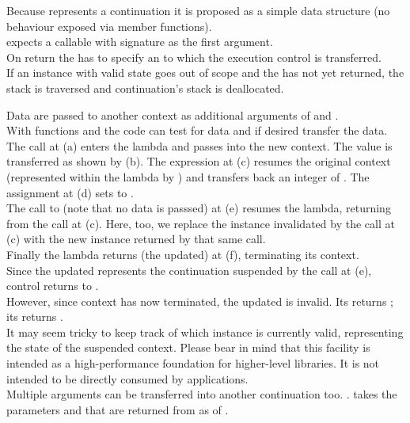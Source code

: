 \label{design}

Because \cont represents a continuation it is proposed as a simple data
structure (no behaviour exposed via member functions).\\
\call expects a callable with signature
 as the first argument.\\
On return the \entryfn has to specify an \cont to which the execution control is
transferred.\\
If an instance with valid state goes out of scope and the \entryfn has not yet
returned, the stack is traversed  and continuation's stack is deallocated.


\label{subsec:data}

Data are passed to another context as additional arguments of \call and
\resume.\\
With functions \davail and \dtransfer the code can test for data and if desired
transfer the data.
The  call at (a) enters the lambda and passes  into the
new context. The value is transferred as shown by (b). The expression
 at (c) resumes the original context (represented
within the lambda by ) and transfers back an integer of .
The assignment at (d) sets  to .\\
The call to  (note that no data is passsed) at (e) resumes the
 lambda, returning from the  call at (c). Here, too,
we replace the \cont instance  invalidated by the \resume call at (c)
with the new instance returned by that same \resume call.\\
Finally the lambda returns (the updated)  at (f), terminating its
context.\\
Since the updated  represents the continuation suspended by the call at
(e), control returns to \main.\\
However, since context  has now terminated, the updated  is
invalid. Its \opbool returns ; its  returns
.\\
It may seem tricky to keep track of which \cont instance is currently valid,
representing the state of the suspended context. Please bear in mind that this
facility is intended as a high-performance foundation for higher-level
libraries. It is not intended to be directly consumed by applications.\\
Multiple arguments can be transferred into another continuation too.
.
\call takes the parameters  and  that are returned from \dtransfer
as  of .


